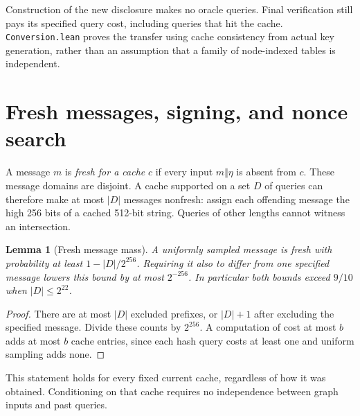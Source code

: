 \documentclass[10pt]{article}
\newtheorem{lemma}[theorem]{Lemma}
\begin{document}
Construction of the new disclosure makes no oracle queries. Final verification still pays its specified query cost, including queries that hit the cache. \texttt{Conversion.lean} proves the transfer using cache consistency from actual key generation, rather than an assumption that a family of node-indexed tables is independent.

\section{Fresh messages, signing, and nonce search}\label{sec:fresh}

A message $m$ is \emph{fresh for a cache} $c$ if every input $m\Vert\eta$ is absent from $c$. These message domains are disjoint. A cache supported on a set $D$ of queries can therefore make at most $|D|$ messages nonfresh: assign each offending message the high 256 bits of a cached 512-bit string. Queries of other lengths cannot witness an intersection.

\begin{lemma}[Fresh message mass]\label{lem:fresh}
A uniformly sampled message is fresh with probability at least $1-|D|/2^{256}$. Requiring it also to differ from one specified message lowers this bound by at most $2^{-256}$. In particular both bounds exceed $9/10$ when $|D|\le2^{22}$.
\end{lemma}
\begin{proof}
There are at most $|D|$ excluded prefixes, or $|D|+1$ after excluding the specified message. Divide these counts by $2^{256}$. A computation of cost at most $b$ adds at most $b$ cache entries, since each hash query costs at least one and uniform sampling adds none.
\end{proof}

This statement holds for every fixed current cache, regardless of how it was obtained. Conditioning on that cache requires no independence between graph inputs and past queries.
\end{document}
